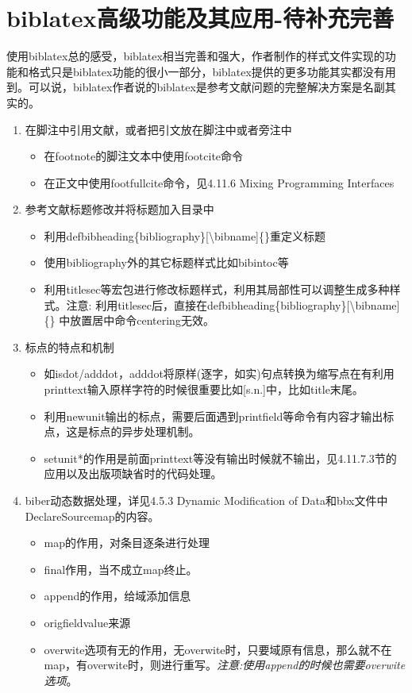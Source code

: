 \section{biblatex高级功能及其应用-待补充完善}
使用biblatex总的感受，biblatex相当完善和强大，作者制作的样式文件实现的功能和格式只是biblatex功能的很小一部分，biblatex提供的更多功能其实都没有用到。可以说，biblatex作者说的biblatex是参考文献问题的完整解决方案是名副其实的。
\begin{enumerate}

  \item 在脚注中引用文献，或者把引文放在脚注中或者旁注中
  \begin{itemize}
    \item 在footnote的脚注文本中使用footcite命令
    \item 在正文中使用footfullcite命令，见4.11.6 Mixing Programming Interfaces
  \end{itemize}

  \item 参考文献标题修改并将标题加入目录中
  \begin{itemize}
    \item 利用defbibheading\{bibliography\}[\textbackslash bibname]\{\}重定义标题
    \item 使用bibliography外的其它标题样式比如bibintoc等
    \item 利用titlesec等宏包进行修改标题样式，利用其局部性可以调整生成多种样式。注意: 利用titlesec后，直接在defbibheading\{bibliography\}[\textbackslash bibname]\{\} 中放置居中命令centering无效。
  \end{itemize}

  \item 标点的特点和机制
  \begin{itemize}
    \item 如isdot/adddot，adddot将原样(逐字，如实)句点转换为缩写点在有利用printtext输入原样字符的时候很重要比如[s.n.]中，比如title末尾。
    \item 利用newunit输出的标点，需要后面遇到printfield等命令有内容才输出标点，这是标点的异步处理机制。
    \item setunit*的作用是前面printtext等没有输出时候就不输出，见4.11.7.3节的应用以及出版项缺省时的代码处理。
  \end{itemize}

  \item biber动态数据处理，详见4.5.3 Dynamic Modification of Data和bbx文件中DeclareSourcemap的内容。
  \begin{itemize}
    \item map的作用，对条目逐条进行处理
    \item final作用，当不成立map终止。
    \item append的作用，给域添加信息
    \item origfieldvalue来源
    \item overwite选项有无的作用，无overwite时，只要域原有信息，那么就不在map，有overwite时，则进行重写。\emph{注意:使用append的时候也需要overwite选项}。
  \end{itemize}


\end{enumerate}
